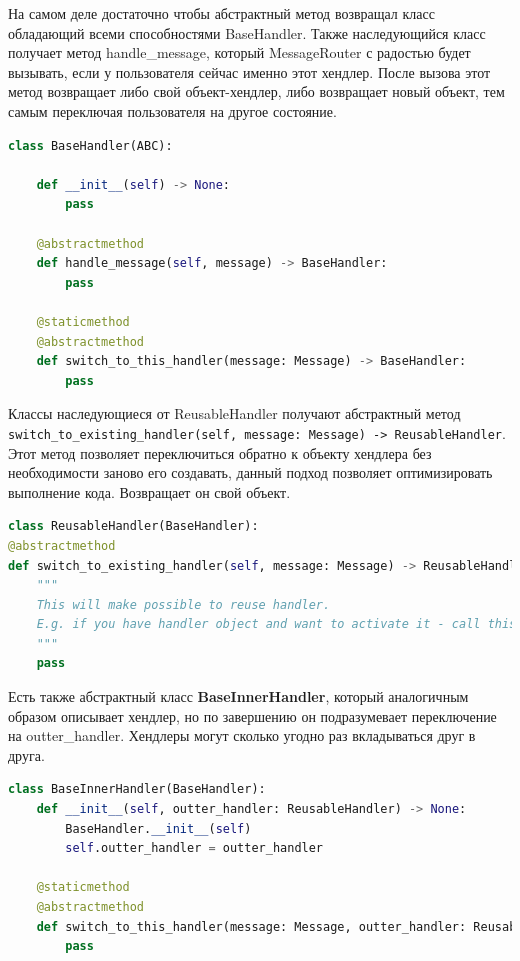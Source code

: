 \documentclass[12pt]{extarticle}
\begin{document}
На самом деле достаточно чтобы абстрактный метод возвращал класс обладающий всеми способностями BaseHandler. Также наследующийся класс получает метод handle\_message, который MessageRouter с радостью будет вызывать, если у пользователя сейчас именно этот хендлер. После вызова этот метод возвращает либо свой объект-хендлер, либо возвращает новый объект, тем самым переключая пользователя на другое состояние.

\begin{lstlisting}[language=Python,style=mystyle,caption=class BaseHandler]
class BaseHandler(ABC):
    
    def __init__(self) -> None:
        pass

    @abstractmethod
    def handle_message(self, message) -> BaseHandler:
        pass

    @staticmethod
    @abstractmethod
    def switch_to_this_handler(message: Message) -> BaseHandler:
        pass

\end{lstlisting}

Классы наследующиеся от ReusableHandler получают абстрактный метод \verb|switch_to_existing_handler(self, message: Message) -> ReusableHandler|. Этот метод позволяет переключиться обратно к объекту хендлера без необходимости заново его создавать, данный подход позволяет оптимизировать выполнение кода. Возвращает он свой объект.

\begin{lstlisting}[language=Python,style=mystyle,caption=class ReusableHandler]
class ReusableHandler(BaseHandler):
@abstractmethod
def switch_to_existing_handler(self, message: Message) -> ReusableHandler:
    """
    This will make possible to reuse handler.
    E.g. if you have handler object and want to activate it - call this method.
    """
    pass
\end{lstlisting}

Есть также абстрактный класс \textbf{BaseInnerHandler}, который аналогичным образом описывает хендлер, но по завершению он подразумевает переключение на outter\_handler. Хендлеры могут сколько угодно раз вкладываться друг в друга.

\begin{lstlisting}[language=Python,style=mystyle,caption=class BaseInnerHandler]
class BaseInnerHandler(BaseHandler):
    def __init__(self, outter_handler: ReusableHandler) -> None:
        BaseHandler.__init__(self)
        self.outter_handler = outter_handler

    @staticmethod
    @abstractmethod
    def switch_to_this_handler(message: Message, outter_handler: ReusableHandler) -> BaseInnerHandler:
        pass
\end{lstlisting}
\end{document}
